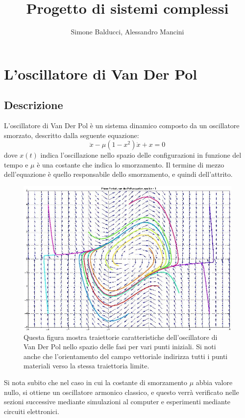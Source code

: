 \documentclass[12pt]{article}
\title{Progetto di sistemi complessi}
\author{Simone Balducci, Alessandro Mancini}
\date{}
\begin{document}
\maketitle 
\section{L'oscillatore di Van Der Pol}
\subsection{Descrizione}
L'oscillatore di Van Der Pol è un sistema dinamico composto da un oscillatore smorzato, descritto dalla seguente equazione:
\begin{equation}
	\ddot{x} - \mu(1-x^2)\dot{x} + x = 0
\end{equation}
dove $x(t)$ indica l'oscillazione nello spazio delle configurazioni in funzione del tempo e $\mu$ è una costante che indica lo smorzamento. Il termine di mezzo dell'equazione è quello responsabile dello smorzamento, e quindi dell'attrito. 
\begin{figure}[h]
	\begin{center}
		\includegraphics[scale=.5]{Spazio delle fasi oscillatore} 
		\caption{Questa figura mostra traiettorie caratteristiche dell'oscillatore di Van Der Pol nello spazio delle fasi per vari punti iniziali. Si noti anche che l'orientamento del campo vettoriale indirizza tutti i punti materiali verso la stessa traiettoria limite.}
	\end{center}
\end{figure}
Si nota subito che nel caso in cui la costante di smorzamento $\mu$ abbia valore nullo, si ottiene un oscillatore armonico classico, e questo verrà verificato nelle sezioni successive mediante simulazioni al computer e esperimenti mediante circuiti elettronici. 
\end{document}
